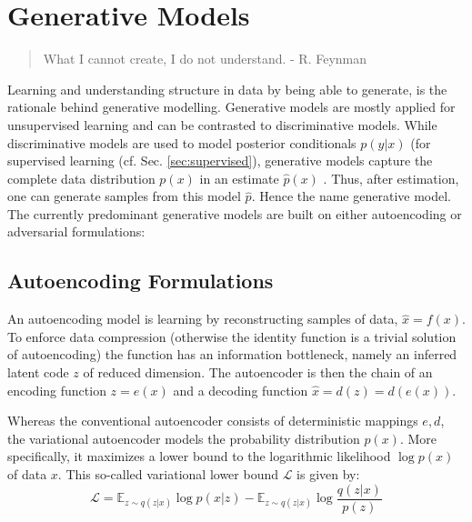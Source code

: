 \section{Generative Models}\label{sec:genmodel}
	\begin{quote}
	    What I cannot create, I do not understand. - R. Feynman
	\end{quote}
	Learning and understanding structure in data by being able to generate, is the rationale behind generative modelling.
	Generative models are mostly applied for unsupervised learning and can be contrasted to discriminative models. While discriminative models are used to model posterior conditionals $p(y|x)$ (\eg for supervised learning (cf. Sec. \ref{sec:supervised}), generative models capture the complete data distribution $p(x)$ in an estimate $\hat p(x)$ \cite{bishop06pattern}. Thus, after estimation, one can generate samples from this model $\hat p$. Hence the name generative model.
	The currently predominant generative models are built on either autoencoding or adversarial formulations:

	\subsection{Autoencoding Formulations}\label{sec:autoencoding}
		An autoencoding model is learning by reconstructing samples of data, $\hat x = f(x)$. To enforce data compression (otherwise the identity function is a trivial solution of autoencoding) the function has an information bottleneck, namely an inferred latent code $z$ of reduced dimension. The autoencoder is then the chain of an encoding function $z = e(x)$ and a decoding function $\hat x = d(z) = d(e(x))$.

		Whereas the conventional autoencoder consists of deterministic mappings $e, d$, the {variational autoencoder} \cite{kingma13vae} models the probability distribution $p(x)$. More specifically, it maximizes a lower bound to the logarithmic likelihood $\log p(x)$ of data $x$. This so-called variational lower bound $\mathcal{L}$ is given by:
		\begin{equation}\label{eq:vae}
			\mathcal{L} = \mathds{E}_{z\sim q(z|x)}  \log p(x|z) - \mathds{E}_{z\sim q(z|x)} \log \frac{q(z|x)}{p(z)}
		\end{equation}


